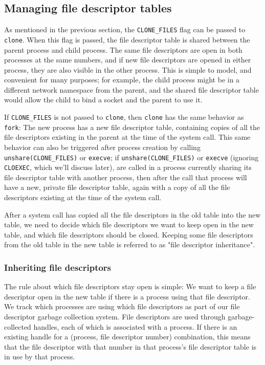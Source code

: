 \documentclass{acmart}
\begin{document}
\subsection{Managing file descriptor tables}\label{fdtables}
As mentioned in the previous section,
the \verb|CLONE_FILES| flag can be passed to \texttt{clone}.
When this flag is passed,
the file descriptor table is shared between the parent process and child process.
The same file descriptors are open in both processes at the same numbers,
and if new file descriptors are opened in either process,
they are also visible in the other process.
This is simple to model,
and convenient for many purposes;
for example, the child process might be in a different network namespace from the parent,
and the shared file descriptor table would allow the child to bind a socket
and the parent to use it.

If \verb|CLONE_FILES| is not passed to \texttt{clone},
then \texttt{clone} has the same behavior as \texttt{fork}:
The new process has a new file descriptor table,
containing copies of all the file descriptors existing in the parent at the time of the system call.
This same behavior can also be triggered after process creation by calling \verb|unshare(CLONE_FILES)| or \texttt{execve};
if \verb|unshare(CLONE_FILES)| or \texttt{execve} (ignoring \texttt{CLOEXEC}, which we'll discuss later),
are called in a process currently sharing its file descriptor table with another process,
then after the call that process will have a new, private file descriptor table,
again with a copy of all the file descriptors existing at the time of the system call.

After a system call has copied all the file descriptors in the old table into the new table,
we need to decide which file descriptors we want to keep open in the new table,
and which file descriptors should be closed.
Keeping some file descriptors from the old table in the new table
is referred to as "file descriptor inheritance".
\subsubsection{Inheriting file descriptors}
The rule about which file descriptors stay open is simple:
We want to keep a file descriptor open in the new table
if there is a process using that file descriptor.
We track which processes are using which file descriptors as part of our file descriptor garbage collection system.
File descriptors are used through garbage-collected handles,
each of which is associated with a process.
If there is an existing handle for a (process, file descriptor number) combination,
this means that the file descriptor with that number in that process's file descriptor table is in use by that process.
\end{document}
